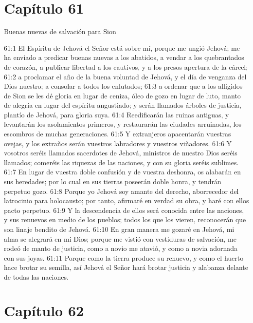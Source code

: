 \section*{Capítulo 61 }
Buenas nuevas de salvación para Sion 
 
61:1 El Espíritu de Jehová el Señor está sobre mí, porque me ungió Jehová; me ha enviado a predicar buenas nuevas a los abatidos, a vendar a los quebrantados de corazón, a publicar libertad a los cautivos, y a los presos apertura de la cárcel; 
61:2 a proclamar el año de la buena voluntad de Jehová, y el día de venganza del Dios nuestro; a consolar a todos los enlutados; 
61:3 a ordenar que a los afligidos de Sion se les dé gloria en lugar de ceniza, óleo de gozo en lugar de luto, manto de alegría en lugar del espíritu angustiado; y serán llamados árboles de justicia, plantío de Jehová, para gloria suya. 
61:4 Reedificarán las ruinas antiguas, y levantarán los asolamientos primeros, y restaurarán las ciudades arruinadas, los escombros de muchas generaciones. 
61:5 Y extranjeros apacentarán vuestras ovejas, y los extraños serán vuestros labradores y vuestros viñadores. 
61:6 Y vosotros seréis llamados sacerdotes de Jehová, ministros de nuestro Dios seréis llamados; comeréis las riquezas de las naciones, y con su gloria seréis sublimes. 
61:7 En lugar de vuestra doble confusión y de vuestra deshonra, os alabarán en sus heredades; por lo cual en sus tierras poseerán doble honra, y tendrán perpetuo gozo. 
61:8 Porque yo Jehová soy amante del derecho, aborrecedor del latrocinio para holocausto; por tanto, afirmaré en verdad su obra, y haré con ellos pacto perpetuo. 
61:9 Y la descendencia de ellos será conocida entre las naciones, y sus renuevos en medio de los pueblos; todos los que los vieren, reconocerán que son linaje bendito de Jehová. 
61:10 En gran manera me gozaré en Jehová, mi alma se alegrará en mi Dios; porque me vistió con vestiduras de salvación, me rodeó de manto de justicia, como a novio me atavió, y como a novia adornada con sus joyas. 
61:11 Porque como la tierra produce su renuevo, y como el huerto hace brotar su semilla, así Jehová el Señor hará brotar justicia y alabanza delante de todas las naciones. 
\section*{Capítulo 62 }
 
